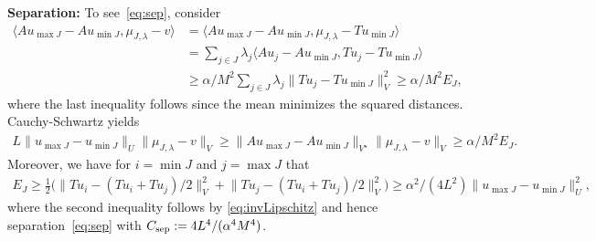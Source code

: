 \documentclass[10pt,reqno]{amsart}
\newtheorem{lemma}[theorem]{Lemma}
\theoremstyle{definition}
\theoremstyle{remark}
\newcommand{\N}{\mathbb N}
\newcommand{\Nzero}{\mathbb N_0}
\newcommand{\norm}[1]{\lVert #1\rVert}
\newcommand{\dual}[2]{\langle #1,#2\rangle}
\begin{document}
\textbf{Separation:} To see~\eqref{eq:sep}, consider
    \begin{align*}
        \dual{Au_{\max J}-Au_{\min J}}{\mu_{J,\lambda}-v} &= 
         \dual{Au_{\max J}-Au_{\min J}}{\mu_{J,\lambda}-Tu_{\min J}} \\
         &= \sum_{j\in J}\lambda_{j}\dual{Au_j-Au_{\min J}}{Tu_j-Tu_{\min J}} \\
         &\geq 
         \alpha/M^2\sum_{j\in J} \lambda_{j}\norm{Tu_j-Tu_{\min J}}_V^2\geq \alpha/M^2 E_J,
         \end{align*}
    where the last inequality follows since the mean minimizes the squared distances. Cauchy-Schwartz yields
    \begin{align*}
     L\norm{u_{\max J}-u_{\min J}}_{U} \norm{\mu_{J,\lambda}-v}_V \geq \norm{Au_{\max J}-Au_{\min J}}_{V^\star}\norm{\mu_{J,\lambda}-v}_V\geq \alpha/M^2 E_{J}.
    \end{align*}
    Moreover, we have for $i=\min J$ and $j=\max J$ that
    \begin{align*}
        E_{ J}\geq \frac12\Big(\norm{Tu_i-(Tu_i+Tu_j)/2}_V^2+\norm{Tu_j-(Tu_i+Tu_j)/2}_V^2\Big)\geq\alpha^2/(4L^2) \norm{u_{\max J}-u_{\min J}}_{U}^2,
    \end{align*}
    where the second inequality follows by \eqref{eq:invLipschitz}
    and hence separation~\eqref{eq:sep} with $C_{\rm sep}:=4L^4/(\alpha^4M^4)$.

\end{document}
